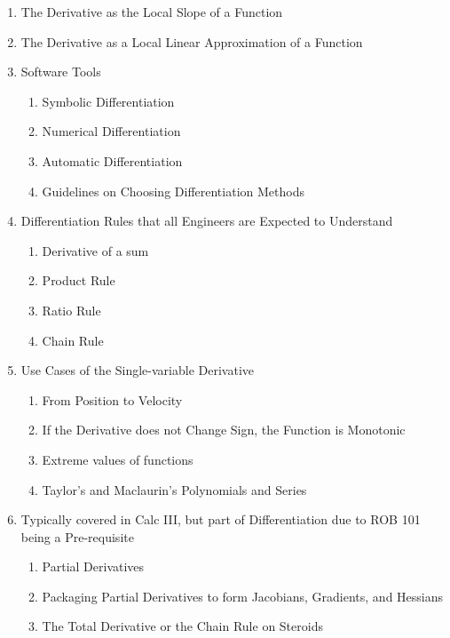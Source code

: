 \begin{enumerate}
\begin{enumerate}
  \item The Derivative as the Local Slope of a Function
  \item The Derivative as a Local Linear Approximation of a Function 
  \item Software Tools
  \begin{enumerate}
  \item Symbolic Differentiation
  \item Numerical Differentiation
  \item Automatic Differentiation
  \item Guidelines on Choosing Differentiation Methods  
\end{enumerate}

  \item Differentiation Rules that all Engineers are Expected to Understand 
  \begin{enumerate}
    \item Derivative of a sum
    \item Product Rule
    \item Ratio Rule
    \item Chain Rule
\end{enumerate}
  \item Use Cases of the Single-variable Derivative 
  \begin{enumerate}
  \item From Position to Velocity 
  \item If the Derivative does not Change Sign, the Function is Monotonic 
  \item Extreme values of functions
  \item Taylor’s and Maclaurin’s Polynomials and Series 
\end{enumerate}


\item Typically covered in Calc III, but part of Differentiation due to ROB 101 being a Pre-requisite
 \begin{enumerate}
   \item Partial Derivatives
  \item Packaging Partial Derivatives to form Jacobians, Gradients, and Hessians 
  \item The Total Derivative or the Chain Rule on Steroids 
  \end{enumerate}


\end{enumerate}
\end{enumerate}
